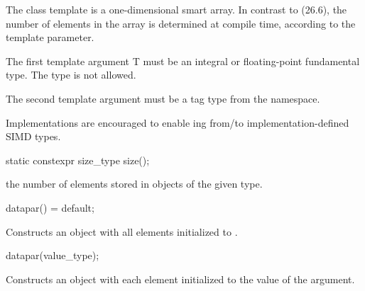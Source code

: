 

\pnum The class template \datapar{} is a one-dimensional smart array.
In contrast to  (26.6), the number of elements in the array is determined at compile time, according to the  template parameter.

\pnum The first template argument \type T must be an integral or floating-point fundamental type.
The type \bool is not allowed.

\pnum The second template argument  must be a tag type from the  namespace.

\pnum\realnote Implementations are encouraged to enable ing from/to implementation-defined SIMD types.

\begin{itemdecl}
static constexpr size_type size();
\end{itemdecl}
\begin{itemdescr}
  \pnum\returns the number of elements stored in objects of the given \datapar[<T, Abi>] type.
\end{itemdescr}

\begin{itemdecl}
datapar() = default;
\end{itemdecl}
\begin{itemdescr}
  \pnum
  \effects
  Constructs an object with all elements initialized to .
\end{itemdescr}

\begin{itemdecl}
datapar(value_type);
\end{itemdecl}
\begin{itemdescr}
  \pnum
  \effects
  Constructs an object with each element initialized to the value of the argument.
\end{itemdescr}


